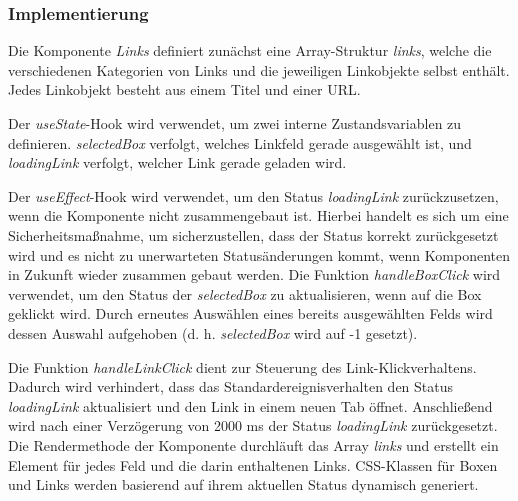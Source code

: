 \newpage
\subsubsection{Implementierung}
Die Komponente \emph{Links} definiert zunächst eine Array-Struktur \emph{links}, welche die verschiedenen Kategorien von Links und die jeweiligen Linkobjekte selbst enthält. Jedes Linkobjekt besteht aus einem Titel und einer URL.

Der \emph{useState}-Hook wird verwendet, um zwei interne Zustandsvariablen zu definieren. \emph{selectedBox} verfolgt, welches Linkfeld gerade ausgewählt ist, und \emph{loadingLink} verfolgt, welcher Link gerade geladen wird.

Der \emph{useEffect}-Hook wird verwendet, um den Status \emph{loadingLink} zurückzusetzen, wenn die Komponente nicht zusammengebaut ist. Hierbei handelt es sich um eine Sicherheitsmaßnahme, um sicherzustellen, dass der Status korrekt zurückgesetzt wird und es nicht zu unerwarteten Statusänderungen kommt, wenn Komponenten in Zukunft wieder zusammen gebaut werden. Die Funktion \emph{handleBoxClick} wird verwendet, um den Status der \emph{selectedBox} zu aktualisieren, wenn auf die Box geklickt wird. Durch erneutes Auswählen eines bereits ausgewählten Felds wird dessen Auswahl aufgehoben (d. h. \emph{selectedBox} wird auf -1 gesetzt).

Die Funktion \emph{handleLinkClick} dient zur Steuerung des Link-Klickverhaltens. Dadurch wird verhindert, dass das Standardereignisverhalten den Status \emph{loadingLink} aktualisiert und den Link in einem neuen Tab öffnet. Anschließend wird nach einer Verzögerung von 2000 ms der Status \emph{loadingLink} zurückgesetzt. Die Rendermethode der Komponente durchläuft das Array \emph{links} und erstellt ein Element für jedes Feld und die darin enthaltenen Links. CSS-Klassen für Boxen und Links werden basierend auf ihrem aktuellen Status dynamisch generiert.

